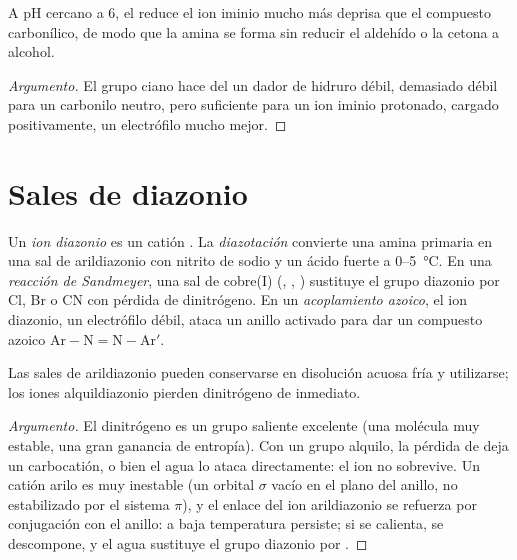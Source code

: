 \begin{proposition}\label{prop:b2:amines:reductive-amination}
A pH cercano a 6, el  reduce el ion iminio mucho más deprisa que el compuesto carbonílico, de modo que
la amina se forma sin reducir el aldehído o la cetona a alcohol.
\end{proposition}

\begin{proof}[Argumento]
El grupo ciano hace del  un dador de hidruro débil, demasiado débil para un carbonilo neutro, pero
suficiente para un ion iminio protonado, cargado positivamente, un electrófilo mucho mejor.
\end{proof}

\section{Sales de diazonio}

\begin{definition}\label{def:b2:amines:diazonium}
Un \emph{ion diazonio} es un catión . La \emph{diazotación}
convierte una amina  primaria en una sal de arildiazonio con nitrito de sodio y un ácido fuerte a
0--\qty{5}{\degreeCelsius}. En una \emph{reacción de Sandmeyer}, una sal de cobre(I)
(, , ) sustituye el grupo diazonio por Cl, Br o CN con pérdida de
dinitrógeno. En un \emph{acoplamiento azoico}, el ion diazonio, un electrófilo débil,
ataca un anillo  activado para dar un compuesto azoico $\mathrm{Ar{-}N{=}N{-}Ar'}$.
\end{definition}

\begin{proposition}\label{prop:b2:amines:diazonium}
Las sales de arildiazonio pueden conservarse en disolución acuosa fría y utilizarse; los iones alquildiazonio pierden
dinitrógeno de inmediato.
\end{proposition}

\begin{proof}[Argumento]
El dinitrógeno es un grupo saliente excelente (una molécula muy estable, una gran ganancia de entropía). Con un
grupo alquilo, la pérdida de  deja un carbocatión, o bien el agua lo ataca directamente: el ion no
sobrevive. Un catión arilo es muy inestable (un orbital $\sigma$ vacío en el plano del anillo,
no estabilizado por el sistema $\pi$), y el enlace  del ion arildiazonio se
refuerza por conjugación con el anillo: a baja temperatura persiste; si se calienta, se descompone,
y el agua sustituye el grupo diazonio por .
\end{proof}

